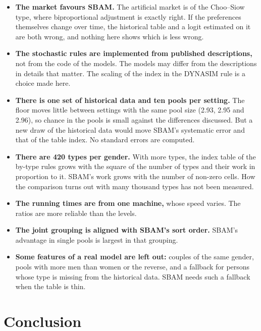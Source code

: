 \documentclass[12pt,a4paper]{article}
\begin{document}
\begin{itemize}
\item \textbf{The market favours SBAM.} The artificial market is of the Choo--Siow type, where
biproportional adjustment is exactly right. If the preferences themselves change over time, the
historical table and a logit estimated on it are both wrong, and nothing here shows which is less
wrong.

\item \textbf{The stochastic rules are implemented from published descriptions,} not from the
code of the models. The models may differ from the descriptions in details that matter. The
scaling of the index in the DYNASIM rule is a choice made here.

\item \textbf{There is one set of historical data and ten pools per setting.} The floor moves
little between settings with the same pool size (2.93, 2.95 and 2.96), so chance in the pools is
small against the differences discussed. But a new draw of the historical data would move SBAM's
systematic error and that of the table index. No standard errors are computed.

\item \textbf{There are 420 types per gender.} With more types, the index table of the by-type
rules grows with the square of the number of types and their work in proportion to it. SBAM's
work grows with the number of non-zero cells. How the comparison turns out with many thousand
types has not been measured.

\item \textbf{The running times are from one machine,} whose speed varies. The ratios are more
reliable than the levels.

\item \textbf{The joint grouping is aligned with SBAM's sort order.} SBAM's advantage in single
pools is largest in that grouping.

\item \textbf{Some features of a real model are left out:} couples of the same gender, pools
with more men than women or the reverse, and a fallback for persons whose type is missing from
the historical data. SBAM needs such a fallback when the table is thin.
\end{itemize}

\section{Conclusion}
\end{document}
